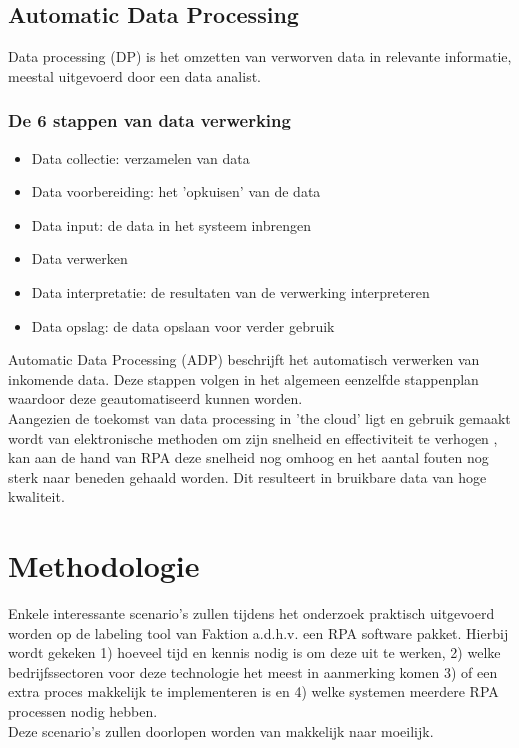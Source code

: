 \subsection{Automatic Data Processing}
Data processing (DP) is het omzetten van verworven data in relevante informatie, meestal uitgevoerd door een data analist. \autocite{whatIsDP}

\subsubsection{De 6 stappen van data verwerking}
\begin{itemize}
	\item Data collectie: verzamelen van data
	\item Data voorbereiding: het 'opkuisen' van de data
	\item Data input: de data in het systeem inbrengen
	\item Data verwerken
	\item Data interpretatie: de resultaten van de verwerking interpreteren
	\item Data opslag: de data opslaan voor verder gebruik
\end{itemize}  \autocite{whatIsDP}

Automatic Data Processing (ADP) beschrijft het automatisch verwerken van inkomende data. Deze stappen volgen in het algemeen eenzelfde stappenplan waardoor deze geautomatiseerd kunnen worden. \\
Aangezien de toekomst van data processing in 'the cloud' ligt en gebruik gemaakt wordt van elektronische methoden om zijn snelheid en effectiviteit te verhogen \autocite{whatIsDP}, kan aan de hand van RPA deze snelheid nog omhoog en het aantal fouten nog sterk naar beneden gehaald worden. Dit resulteert in bruikbare data van hoge kwaliteit.

\section{Methodologie}
\label{sec:methodologie}
Enkele interessante scenario's zullen tijdens het onderzoek praktisch uitgevoerd worden op de labeling tool van Faktion a.d.h.v. een RPA software pakket. Hierbij wordt gekeken 1) hoeveel tijd en kennis nodig is om deze uit te werken, 2) welke bedrijfssectoren voor deze technologie het meest in aanmerking komen 3) of een extra proces makkelijk te implementeren is en 4) welke systemen meerdere RPA processen nodig hebben. \\
Deze scenario's zullen doorlopen worden van makkelijk naar moeilijk.

